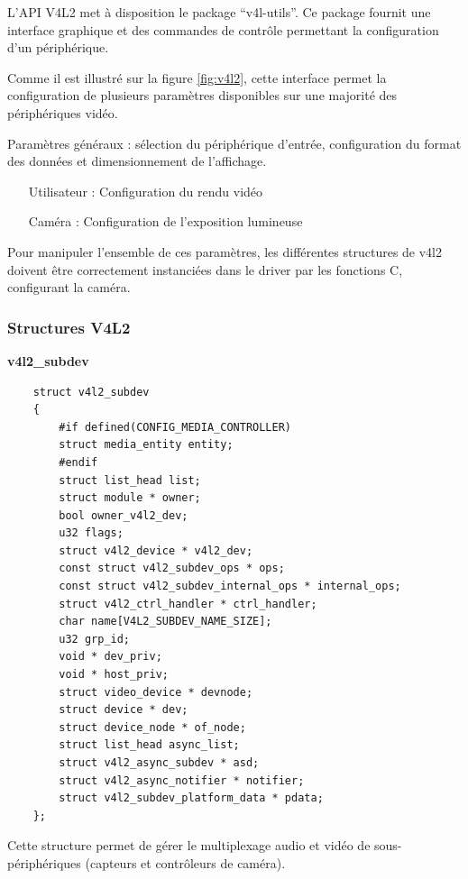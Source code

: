 L’API V4L2 met à disposition le package “v4l-utils”. Ce package fournit une interface
graphique et des commandes de contrôle permettant la configuration d’un périphérique. \medskip

Comme il est illustré sur la figure \ref{fig:v4l2}, cette interface permet la configuration
de  plusieurs paramètres disponibles sur une majorité des périphériques vidéo. \medskip

Paramètres généraux : sélection du périphérique d'entrée, configuration du format des données et
dimensionnement de l'affichage.

\begin{itemize}
    \item[Utilisateur : ] Configuration du rendu vidéo
    \item[Caméra : ] Configuration de l'exposition lumineuse
\end{itemize}

Pour manipuler l'ensemble de ces paramètres, les différentes structures de v4l2 doivent
être correctement instanciées dans le driver par les fonctions C, configurant la caméra.

\subsubsection{Structures V4L2}

\textbf{v4l2\_subdev}

\begin{lstlisting}
    struct v4l2_subdev
    {
        #if defined(CONFIG_MEDIA_CONTROLLER)
        struct media_entity entity;
        #endif
        struct list_head list;
        struct module * owner;
        bool owner_v4l2_dev;
        u32 flags;
        struct v4l2_device * v4l2_dev;
        const struct v4l2_subdev_ops * ops;
        const struct v4l2_subdev_internal_ops * internal_ops;
        struct v4l2_ctrl_handler * ctrl_handler;
        char name[V4L2_SUBDEV_NAME_SIZE];
        u32 grp_id;
        void * dev_priv;
        void * host_priv;
        struct video_device * devnode;
        struct device * dev;
        struct device_node * of_node;
        struct list_head async_list;
        struct v4l2_async_subdev * asd;
        struct v4l2_async_notifier * notifier;
        struct v4l2_subdev_platform_data * pdata;
    };
\end{lstlisting}

Cette structure permet de gérer le multiplexage audio et vidéo de
sous-périphériques (capteurs et contrôleurs de caméra).

